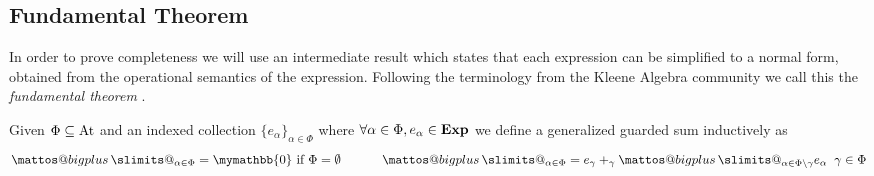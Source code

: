 \documentclass[a4paper,UKenglish,cleveref, autoref, thm-restate]{lipics-v2021}
\makeatletter
\newcommand{\At}{\text{\upshape{At}}}
\newcommand{\Exp}{\textbf{\upshape{Exp}}}
\newcommand{\babort}{\mymathbb{0}}
\theoremstyle{plain}\newtheoremrep{thm}{Theorem}[section]
\newcommand{\bigplus}{\DOTSB\mathop{\mathpalette\mattos@bigplus\relax}\slimits@
}
\newcommand\mattos@bigplus[2]{\vcenter{\hbox{\sbox\z@{$#1\sum$}\resizebox{!}{0.9\dimexpr\ht\z@+\dp\z@}{\raisebox{\depth}{$\m@th#1+$}}}}\vphantom{\sum}}
\makeatother
\begin{document}
	
	\subsection{Fundamental Theorem}
	In order to prove completeness we will use an intermediate result which states that each expression can be simplified to a normal form, obtained from the operational semantics of the expression. Following the terminology from the Kleene Algebra community we call this the \textit{fundamental theorem} \cite{RUTTEN20031}.
		\begin{defn}\label{gdedsum}
			Given $\Phi \subseteq \At$ and an indexed collection $\{e_\alpha\}_{\alpha \in \Phi}$ where $\forall \alpha\in\Phi, e_\alpha \in \Exp$ we define a generalized guarded sum inductively as
			$$
				\bigplus_{\alpha \in \Phi} = \babort \text{ if } \Phi = \emptyset\;\;\;\;\;\;\;\;\;\;\; \bigplus_{\alpha \in \Phi} = e_\gamma +_\gamma \bigplus_{\alpha \in \Phi \setminus\gamma} e_\alpha\;\; \gamma \in \Phi
			$$
		\end{defn}
\end{document}
